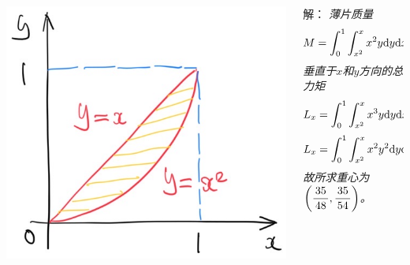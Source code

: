 \begin{frame}
	\linespread{1.5}

	\bigskip
	
	\begin{columns}
		\begin{column}{.45\textwidth}
			\begin{center}
				\includegraphics[width=\textwidth]{./images/ch10/10.4.1.jpg}
			\end{center}
		\end{column}
		\begin{column}{.55\textwidth}
			\small 解：\it
			薄片质量
			$$M=\displaystyle\int_0^1\displaystyle\int_{x^2}^xx^2y\mathrm{d} y\mathrm{d} x=\displaystyle\frac{\,{1}\,}{\,{35}\,}.$$
			垂直于$x$和$y$方向的总力矩
			$$L_x=\displaystyle\int_0^1\displaystyle\int_{x^2}^xx^3y\mathrm{d} y\mathrm{d} x=\displaystyle\frac{\,{1}\,}{\,{48}\,},$$
			$$L_x=\displaystyle\int_0^1\displaystyle\int_{x^2}^xx^2y^2\mathrm{d} y\mathrm{d} x=\displaystyle\frac{\,{1}\,}{\,{54}\,},$$
			故所求重心为$\left(\displaystyle\frac{\,{35}\,}{\,{48}\,},\displaystyle\frac{\,{35}\,}{\,{54}\,}\right)$。\fin
		\end{column}
	\end{columns}
\end{frame}

